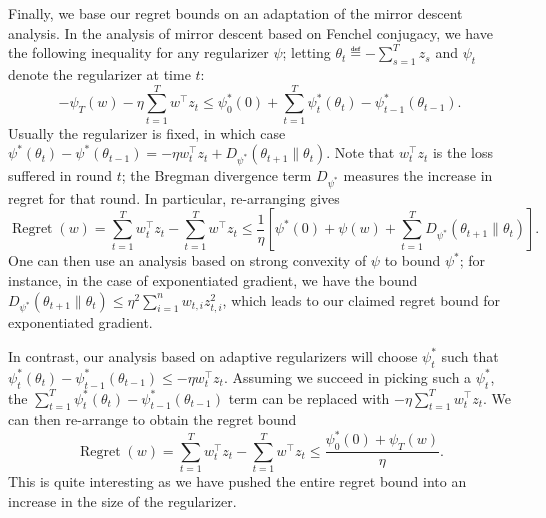 \documentclass[11pt]{article}
\DeclareMathOperator{\Regret}{Regret}
\begin{document}
Finally, we base our regret bounds on an adaptation of the mirror descent analysis. In the analysis of 
mirror descent based on Fenchel conjugacy, we have the following inequality for any regularizer $\psi$; 
letting $\theta_t \eqdef -\sum_{s=1}^T z_s$ and $\psi_t$ denote the regularizer at time $t$:
\begin{equation}
        \label{eqn:bound1}
        -\psi_T(w) - \eta \sum_{t=1}^T w^{\top} z_t \leq \psi_0^*(0) + \sum_{t=1}^T \psi_t^*(\theta_t) - \psi_{t-1}^*(\theta_{t-1}).
\end{equation}
Usually the regularizer is fixed, in which case $\psi^*(\theta_t) - \psi^*(\theta_{t-1}) = -\eta w_t^{\top}z_t + D_{\psi^*}(\theta_{t+1} \| \theta_t)$. 
Note that $w_t^{\top}z_t$ is the loss suffered in round $t$; the Bregman divergence term $D_{\psi^*}$ measures the increase in regret for that round. 
In particular, re-arranging gives
\begin{equation}
        \label{eqn:bound2}
        \Regret(w) = \sum_{t=1}^T w_t^{\top}z_t - \sum_{t=1}^T w^{\top}z_t \leq \frac{1}{\eta}\left[ \psi^*(0) + \psi(w) + \sum_{t=1}^T D_{\psi^*}(\theta_{t+1} \| \theta_t)\right].
\end{equation}
One can then use an analysis based on strong convexity of $\psi$ to bound $\psi^*$; for instance, in the case of exponentiated gradient, 
we have the bound $D_{\psi^*}(\theta_{t+1} \| \theta_t) \leq \eta^2 \sum_{i=1}^n w_{t,i}z_{t,i}^2$, which leads to our claimed regret bound 
for exponentiated gradient.

In contrast, our analysis based on adaptive regularizers will choose $\psi_t^*$ such that $\psi_t^*(\theta_t) - \psi_{t-1}^*(\theta_{t-1}) \leq -\eta w_t^{\top}z_t$. 
Assuming we succeed in picking such a $\psi_t^*$, the $\sum_{t=1}^T \psi_t^*(\theta_t) - \psi_{t-1}^*(\theta_{t-1})$ term can be replaced with 
$-\eta \sum_{t=1}^T w_t^{\top}z_t$. We can then re-arrange to obtain the regret bound
\begin{equation}
        \label{eqn:bound3}
        \Regret(w) = \sum_{t=1}^T w_t^{\top}z_t - \sum_{t=1}^T w^{\top}z_t \leq \frac{\psi_0^*(0) + \psi_T(w)}{\eta}.
\end{equation}
This is quite interesting as we have pushed the entire regret bound into an increase in the size 
of the regularizer.
\end{document}

